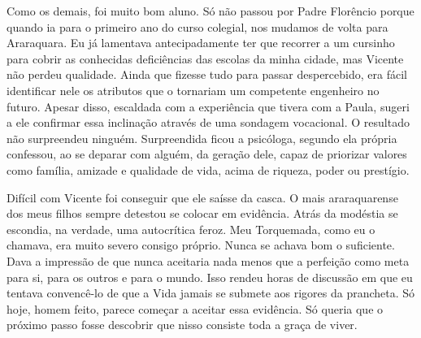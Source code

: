 Como os demais, foi muito bom aluno.
Só não passou por Padre Florêncio porque quando ia para o primeiro ano do curso colegial, nos mudamos de volta para Araraquara.
Eu já lamentava antecipadamente ter que recorrer a um cursinho para cobrir as conhecidas deficiências das escolas da minha cidade, mas Vicente não perdeu qualidade.
Ainda que fizesse tudo para passar despercebido, era fácil identificar nele os atributos que o tornariam um competente engenheiro no futuro.
Apesar disso, escaldada com a experiência que tivera com a Paula, sugeri a ele confirmar essa inclinação através de uma sondagem vocacional.
O resultado não surpreendeu ninguém.
Surpreendida ficou a psicóloga, segundo ela própria confessou, ao se deparar com alguém, da geração dele, capaz de priorizar valores como família, amizade e qualidade de vida, acima de riqueza, poder ou prestígio.

Difícil com Vicente foi conseguir que ele saísse da casca.
O mais araraquarense dos meus filhos sempre detestou se colocar em evidência.
Atrás da modéstia se escondia, na verdade, uma autocrítica feroz.
Meu Torquemada, como eu o chamava, era muito severo consigo próprio.
Nunca se achava bom o suficiente.
Dava a impressão de que nunca aceitaria nada menos que a perfeição como meta para si, para os outros e para o mundo.
Isso rendeu horas de discussão em que eu tentava convencê-lo de que a Vida jamais se submete aos rigores da prancheta.
Só hoje, homem feito, parece começar a aceitar essa evidência.
Só queria que o próximo passo fosse descobrir que nisso consiste toda a graça de viver.
